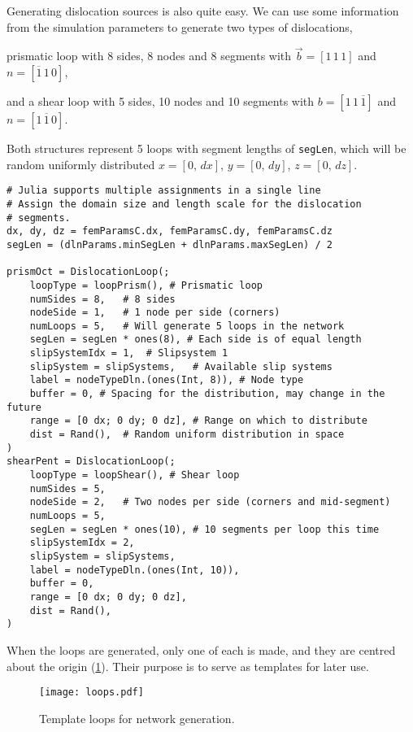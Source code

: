 Generating dislocation sources is also quite easy. We can use some information from the simulation parameters to generate two types of dislocations,
\begin{inparaenum}
    \item prismatic loop with 8 sides, 8 nodes and 8 segments with $\vec{b} = [1\, 1\, 1]$ and $n = [\overline{1}\, 1\, 0]$,
    \item and a shear loop with 5 sides, 10 nodes and 10 segments with $b = [1\, 1\, \overline{1}]$ and $n = [1\, \overline{1}\, 0]$.
\end{inparaenum}
Both structures represent 5 loops with segment lengths of \texttt{segLen}, which will be random uniformly distributed $x = [0,\, dx]$, $y = [0,\, dy]$, $z = [0,\, dz]$.
\begin{verbatim}
# Julia supports multiple assignments in a single line
# Assign the domain size and length scale for the dislocation
# segments.
dx, dy, dz = femParamsC.dx, femParamsC.dy, femParamsC.dz
segLen = (dlnParams.minSegLen + dlnParams.maxSegLen) / 2

prismOct = DislocationLoop(;
    loopType = loopPrism(), # Prismatic loop
    numSides = 8,   # 8 sides
    nodeSide = 1,   # 1 node per side (corners)
    numLoops = 5,   # Will generate 5 loops in the network
    segLen = segLen * ones(8), # Each side is of equal length
    slipSystemIdx = 1,  # Slipsystem 1
    slipSystem = slipSystems,   # Available slip systems
    label = nodeTypeDln.(ones(Int, 8)), # Node type
    buffer = 0, # Spacing for the distribution, may change in the future
    range = [0 dx; 0 dy; 0 dz], # Range on which to distribute
    dist = Rand(),  # Random uniform distribution in space
)
shearPent = DislocationLoop(;
    loopType = loopShear(), # Shear loop
    numSides = 5,
    nodeSide = 2,   # Two nodes per side (corners and mid-segment)
    numLoops = 5,
    segLen = segLen * ones(10), # 10 segments per loop this time
    slipSystemIdx = 2,
    slipSystem = slipSystems,
    label = nodeTypeDln.(ones(Int, 10)),
    buffer = 0,
    range = [0 dx; 0 dy; 0 dz],
    dist = Rand(),
)
\end{verbatim}
When the loops are generated, only one of each is made, and they are centred about the origin (\cref{f:templateLoops}). Their purpose is to serve as templates for later use.
\begin{figure}
    \centering
    \texttt{[image: loops.pdf]}
    \caption{Template loops for network generation.}
    \label{f:templateLoops}
\end{figure}

